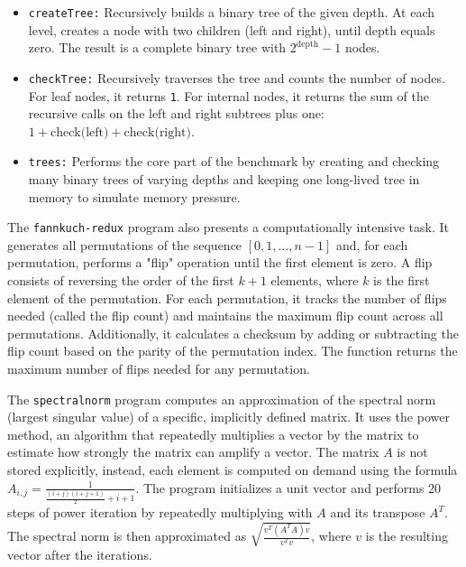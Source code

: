 \begin{itemize}
  \item \texttt{createTree:} Recursively builds a binary tree of the given depth. At each level, creates a node with two children (left and right), until depth equals zero. The result is a complete binary tree with \(2^{\text{depth}} - 1\) nodes.
 
  \item \texttt{checkTree:} Recursively traverses the tree and counts the number of nodes. For leaf nodes, it returns \texttt{1}. For internal nodes, it returns the sum of the recursive calls on the left and right subtrees plus one: $1 + \text{check(left)} + \text{check(right)}$.
  
  \item \texttt{trees:} Performs the core part of the benchmark by creating and checking many binary trees of varying depths and keeping one long-lived tree in memory to simulate memory pressure.
\end{itemize}

The \texttt{fannkuch-redux} program also presents a computationally intensive task. It generates all permutations of the sequence \([0, 1, \ldots, n-1]\) and, for each permutation, performs a "flip" operation until the first element is zero. A flip consists of reversing the order of the first \(k + 1\) elements, where \(k\) is the first element of the permutation. For each permutation, it tracks the number of flips needed (called the flip count) and maintains the maximum flip count across all permutations. Additionally, it calculates a checksum by adding or subtracting the flip count based on the parity of the permutation index. The function returns the maximum number of flips needed for any permutation.

The \texttt{spectralnorm} program computes an approximation of the spectral norm (largest singular value) of a specific, implicitly defined matrix. It uses the power method, an algorithm that repeatedly multiplies a vector by the matrix to estimate how strongly the matrix can amplify a vector. The matrix \(A\) is not stored explicitly, instead, each element is computed on demand using the formula \(A_{i,j} = \frac{1}{\frac{(i + j)(i + j + 1)}{2} + i + 1}\). The program initializes a unit vector and performs 20 steps of power iteration by repeatedly multiplying with \(A\) and its transpose \(A^T\). The spectral norm is then approximated as \(\sqrt{\frac{v^T (A^T A) v}{v^T v}}\), where \(v\) is the resulting vector after the iterations. 

